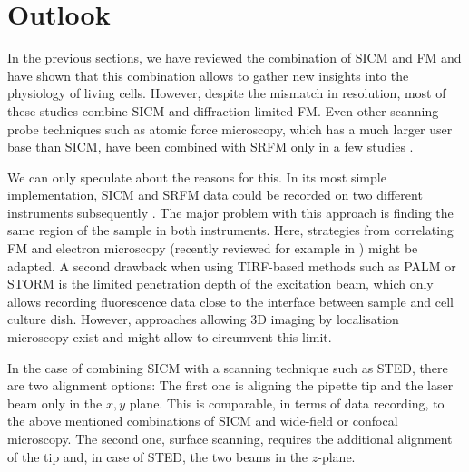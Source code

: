 \section{Outlook}
\label{sec:pitfalls}

In the previous sections, we have reviewed the combination of SICM and FM and
have shown that this combination allows to gather new insights into the
physiology of living cells. However, despite the mismatch in resolution, most
of these studies combine SICM and diffraction limited FM. Even other scanning
probe techniques such as atomic force microscopy, which has a much larger user
base than SICM, have been combined with SRFM only in a few studies
\cite{Harke2012,Chacko2013,Chacko2013b,Odermatt2015,Curry2017,Hirvonen2018}.

We can only speculate about the reasons for this. In its most simple
implementation, SICM and SRFM data could be recorded on two different
instruments subsequently \cite{Hagemann2018}. The major problem with this
approach is finding the same region of the sample in both instruments. Here,
strategies from correlating FM and electron microscopy (recently reviewed for
example in \cite{Begemann2016}) might be adapted. A second drawback when using
TIRF-based methods such as PALM or STORM is the limited penetration depth of
the excitation beam, which only allows recording fluorescence data close to
the interface between sample and cell culture dish. However, approaches
allowing 3D imaging by localisation microscopy exist
\cite{Huang2008a,Huang2008} and might allow to circumvent this limit.  



In the case of combining SICM with a scanning technique such as STED, there
are two alignment options: The first one is aligning the pipette tip and the
laser beam only in the $x,y$ plane. This is comparable, in terms of data
recording, to the above mentioned combinations of SICM and wide-field or
confocal microscopy.  The second one, surface scanning, requires the
additional alignment of the tip and, in case of STED, the two beams in the
$z$-plane.

